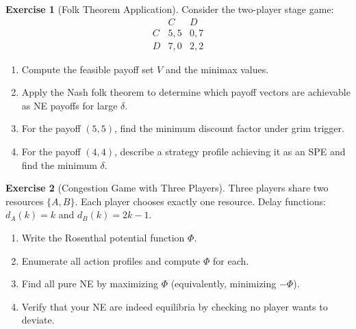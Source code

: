 \documentclass[11pt,a4paper]{article}
\theoremstyle{definition}
\newtheorem{exercise}{Exercise}[section]
\theoremstyle{plain}
\theoremstyle{remark}
\begin{document}
\begin{exercise}[Folk Theorem Application]
\label{ex:folk-application}
Consider the two-player stage game:
\[
\begin{array}{c|cc}
  & C & D \\ \hline
C & 5,5 & 0,7 \\
D & 7,0 & 2,2
\end{array}
\]
\begin{enumerate}[label=(\alph*)]
    \item Compute the feasible payoff set $V$ and the minimax values.
    \item Apply the Nash folk theorem to determine which payoff vectors are achievable as
    NE payoffs for large $\delta$.
    \item For the payoff $(5,5)$, find the minimum discount factor under grim trigger.
    \item For the payoff $(4,4)$, describe a strategy profile achieving it as an SPE and
    find the minimum $\delta$.
\end{enumerate}
\end{exercise}

\begin{exercise}[Congestion Game with Three Players]
\label{ex:congestion-three}
Three players share two resources $\{A, B\}$. Each player chooses exactly one resource.
Delay functions: $d_A(k) = k$ and $d_B(k) = 2k - 1$.
\begin{enumerate}[label=(\alph*)]
    \item Write the Rosenthal potential function $\Phi$.
    \item Enumerate all action profiles and compute $\Phi$ for each.
    \item Find all pure NE by maximizing $\Phi$ (equivalently, minimizing $-\Phi$).
    \item Verify that your NE are indeed equilibria by checking no player wants to deviate.
\end{enumerate}
\end{exercise}
\end{document}
